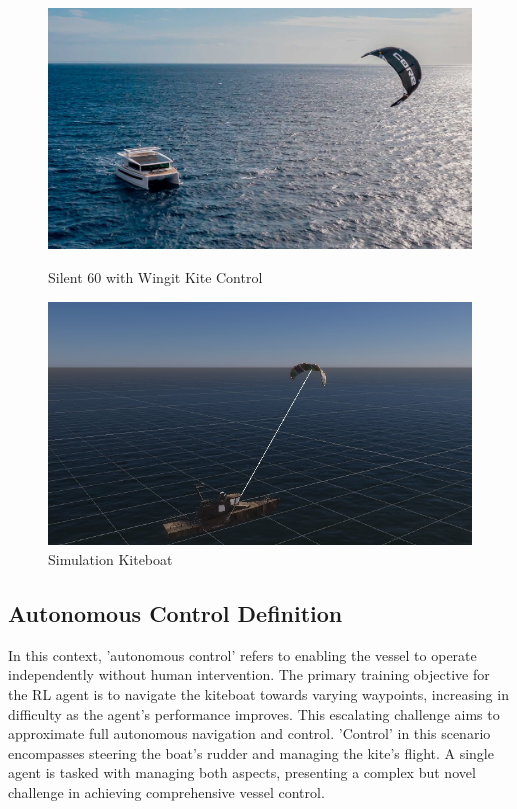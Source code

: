 \begin{figure}[!htb]
    \centering
    \begin{minipage}[t]{0.45\textwidth}
        \includegraphics[width=\linewidth]{Images/kiteboat.jpg}
        \caption{Silent 60 with Wingit Kite Control}\label{kiteboat}
    \end{minipage}\hfill
    \begin{minipage}[t]{0.45\textwidth}
        \includegraphics[width=\linewidth]{Images/kiteboat_diagram.png}
        \caption{Simulation Kiteboat}\label{fig:kiteboat}
    \end{minipage}
\end{figure}


\subsection{Autonomous Control Definition}
In this context, 'autonomous control' refers to enabling the vessel to operate independently without human intervention. The primary training objective for the RL agent is to navigate the kiteboat towards varying waypoints, increasing in difficulty as the agent's performance improves. This escalating challenge aims to approximate full autonomous navigation and control. 'Control' in this scenario encompasses steering the boat's rudder and managing the kite's flight. A single agent is tasked with managing both aspects, presenting a complex but novel challenge in achieving comprehensive vessel control.

